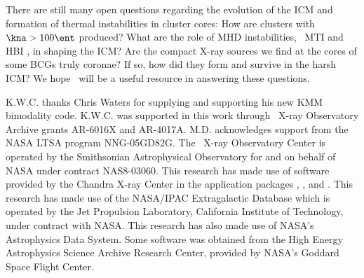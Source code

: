 \documentclass{emulateapj}
\begin{document}
There are still many open questions regarding the evolution of the ICM
and formation of thermal instabilities in cluster cores: How are
clusters with $\kna > 100 \ent$ produced? What are the role of MHD
instabilities, \eg\ MTI \citep{2000ApJ...534..420B,
  2008ApJ...673..758Q} and HBI \citep{2008ApJ...677L...9P}, in shaping
the ICM?  Are the compact X-ray sources we find at the cores of some
BCGs truly coronae?  If so, how did they form and survive in the harsh
ICM? We hope \accept\ will be a useful resource in answering these
questions.

\acknowledgements

K.W.C. thanks Chris Waters for supplying and supporting his new KMM
bimodality code. K.W.C. was supported in this work through
\chandra\ X-ray Observatory Archive grants AR-6016X and
AR-4017A. M.D. acknowledges support from the NASA LTSA program
NNG-05GD82G. The \chandra\ X-ray Observatory Center is operated by the
Smithsonian Astrophysical Observatory for and on behalf of NASA under
contract NAS8-03060. This research has made use of software provided
by the Chandra X-ray Center in the application packages \ciao, \chips,
and \sherpa. This research has made use of the NASA/IPAC Extragalactic
Database which is operated by the Jet Propulsion Laboratory,
California Institute of Technology, under contract with NASA. This
research has also made use of NASA's Astrophysics Data System. Some
software was obtained from the High Energy Astrophysics Science
Archive Research Center, provided by NASA's Goddard Space Flight
Center.








\clearpage
\LongTables

\clearpage

\clearpage

\clearpage


\end{document}
